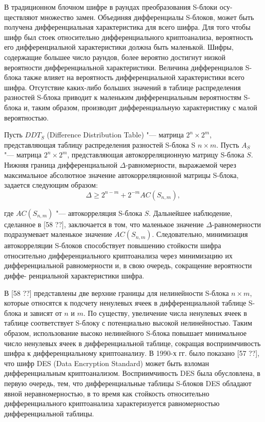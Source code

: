 В традиционном блочном шифре в раундах преобразования S-блоки осу- ществляют
множество замен. Объединяя дифференциалы S-блоков, может быть получена
дифференциальная характеристика для всего шифра. Для того чтобы шифр был стоек
относительно дифференциального криптоанализа, вероятность его дифференциальной
характеристики должна быть маленькой. Шифры, содержащие большее число раундов,
более вероятно достигнут низкой вероятности дифференциальной характеристики.
Величина дифференциалов S-блока также влияет на вероятность дифференциальной
характеристики всего шифра. Отсутствие каких-либо больших значений в таблице
распределения разностей S-блока приводит к маленьким дифференциальным
вероятностям S-блока и, таким образом, производит дифференциальную
характеристику с малой вероятностью.

Пусть $DDT_S$ (Difference Distribution Table) "--- матрица $2^n \times 2^m$,
представляющая таблицу распределения разностей S-блока S $n \times m$.  Пусть
$A_S$ "--- матрица $2^n \times 2^m$, представляющая автокорреляционную матрицу
S-блока $S$. Нижняя граница дифференциальной $\Delta$-равномерности, выражаемой
через максимальное абсолютное значение автокорреляционной матрицы S-блока,
задается следующим образом:
\begin{equation}\Delta \geq 2^{n - m} + 2^{-m} AC(S_{n,m}),\end{equation}

где $AC(S_{n,m})$ "--- автокорреляция S-блока $S$. Дальнейшее наблюдение,
сделанное в [58 ??], заключается в том, что маленькое значение
$\Delta$-равномерности подразумевает маленькое значение $AC(S_{n,m})$.
Следовательно, минимизация автокорреляции S-блоков способствует повышению
стойкости шифра относительно дифференциального криптоанализа через минимизацию
их дифференциальной равномерности и, в свою очередь, сокращение вероятности
диффе- ренциальной характеристики шифра.

В [58 ??] представлены две верхние границы для нелинейности S-блока $n \times
m$, которые относятся к подсчету ненулевых ячеек в дифференциальной таблице S-
блока и зависят от $n$ и $m$. По существу, увеличение числа ненулевых ячеек в
таблице соответствует S-блоку с потенциально высокой нелинейностью. Таким
образом, использование высоко нелинейного S-блока повышает минимальное число
ненулевых ячеек в дифференциальной таблице, сокращая восприимчивость шифра к
дифференциальному криптоанализу. В 1990-х гг. было показано [57 ??], что шифр
DES (Data Encryption Standard) может быть взломан дифференциальным
криптоанализом. Восприимчивость DES была обусловлена, в первую очередь, тем, что
дифференциальные таблицы S-блоков DES обладают явной неравномерностью, в то
время как стойкость относительно дифференциального криптоанализа характеризуется
равномерностью дифференциальной таблицы.


